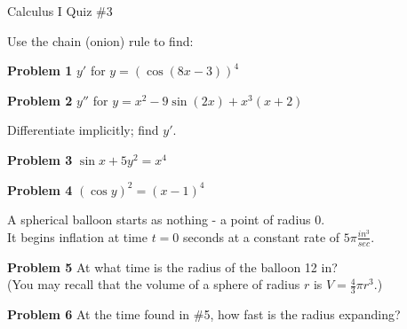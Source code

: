 \documentclass[10pt]{article}
\begin{document}


\begin{center}
Calculus I Quiz \#3
\end{center}


Use the chain (onion) rule to find: 

\vspace{10mm}

\noindent\textbf{Problem 1} $y'$ for $y = (\cos(8x-3))^4$

\vspace{20mm}

\noindent\textbf{Problem 2} $y''$ for $y = x^2 - 9\sin(2x) + x^3(x+2)$

\vspace{30mm}

Differentiate implicitly; find $y'$.

\vspace{20mm}

\noindent\textbf{Problem 3} $\sin x + 5y^2 = x^4$

\vspace{20mm}

\noindent\textbf{Problem 4} $(\cos y)^2 = (x-1)^4$

\vspace{30mm}

A spherical balloon starts as nothing - a point of radius 0. \\
It begins inflation at time $t=0$ seconds at a constant rate of $5\pi \frac{in^3}{sec}$. 

\vspace{5mm}

\noindent\textbf{Problem 5} At what time is the radius of the balloon 12 in? \\
(You may recall that the volume of a sphere of radius $r$ is $V = \frac{4}{3} \pi r^3$.)

\vspace{20mm}

\noindent\textbf{Problem 6} At the time found in \#5, how fast is the radius expanding?
\end{document}
